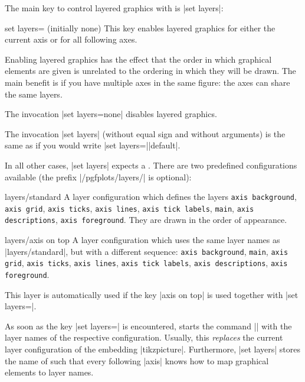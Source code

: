 {The main key to control layered graphics with \PGFPlots{} is |set layers|:


\begin{pgfplotskey}{set layers= (initially none)}
   This key enables layered graphics for either the current axis or for all
   following axes.

   Enabling layered graphics has the effect that the order in which graphical
   elements are given is unrelated to the ordering in which they will be drawn.
   The main benefit is if you have multiple axes in the same figure: the axes
   can share the same layers.

   The invocation |set layers=none| disables layered graphics.

   The invocation |set layers| (without equal sign and without arguments) is
   the same as if you would write |set layers=||default|.

   In all other cases, |set layers| expects a .
   There are two predefined configurations available (the prefix
   |/pgfplots/layers/| is optional):

   \begin{pgfplotskey}{layers/standard}
       A layer configuration which defines the layers \texttt{axis background},
       \texttt{axis grid}, \texttt{axis ticks}, \texttt{axis lines},
       \texttt{axis tick labels}, \texttt{main}, \texttt{axis descriptions},
       \texttt{axis foreground}. They are drawn in the order of appearance.
   \end{pgfplotskey}

   \begin{pgfplotskey}{layers/axis on top}
       A layer configuration which uses the same layer names as
       |layers/standard|, but with a different sequence: \texttt{axis
       background}, \texttt{main}, \texttt{axis grid}, \texttt{axis ticks},
       \texttt{axis lines}, \texttt{axis tick labels}, \texttt{axis
       descriptions}, \texttt{axis foreground}.

        This layer is automatically used if the key |axis on top| is used
        together with |set layers=|.
   \end{pgfplotskey}

    As soon as the key |set layers=| is
    encountered, \PGFPlots{} starts the \pgfname{} command
    |\pgfsetlayers| with the layer names of the respective
    configuration. Usually, this \emph{replaces} the current layer
    configuration of the embedding |tikzpicture|. Furthermore, |set layers|
    stores the name of  such that every
    following |axis| knows how to map graphical elements to layer names.


\end{pgfplotskey}}
